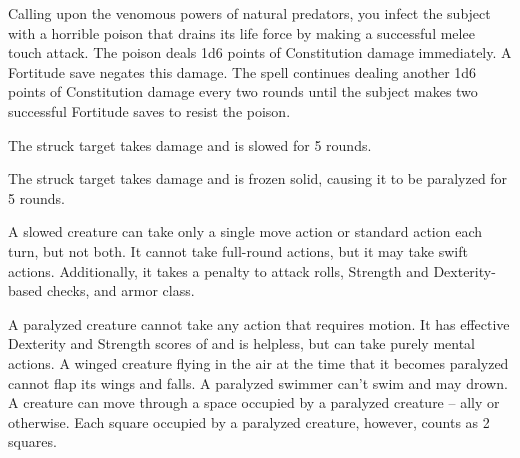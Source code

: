 \begin{spelleffect}
  Calling upon the venomous powers of natural predators, you infect the subject with a horrible poison that drains its life force by making a successful melee touch attack. The poison deals 1d6 points of Constitution damage immediately. A Fortitude save negates this damage. The spell continues dealing another 1d6 points of Constitution damage every two rounds until the subject makes two successful Fortitude saves to resist the poison.
\end{spelleffect}

\spellrng{\rngclose}
\begin{spellhealthy}
  The struck target takes damage and is slowed for 5 rounds.
\end{spellhealthy}
\begin{spellblood}
  The struck target takes damage and is frozen solid, causing it to be paralyzed for 5 rounds.
\end{spellblood}
\begin{spellnotes}
A slowed creature can take only a single move action or standard action each turn, but not both. It cannot take full-round actions, but it may take swift actions. Additionally, it takes a  penalty to attack rolls, Strength and Dexterity-based checks, and armor class.

   A paralyzed creature cannot take any action that requires motion. It has effective Dexterity and Strength scores of  and is helpless, but can take purely mental actions. A winged creature flying in the air at the time that it becomes paralyzed cannot flap its wings and falls. A paralyzed swimmer can't swim and may drown. A creature can move through a space occupied by a paralyzed creature -- ally or otherwise. Each square occupied by a paralyzed creature, however, counts as 2 squares.
 \end{spellnotes}

